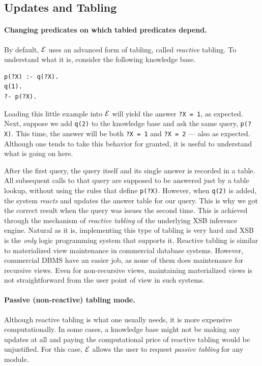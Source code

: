 \documentclass[11pt]{article}
\newcommand{\ERGO}{\mbox{\ensuremath{\cal{E}}\smaller{{\sc{RGO}}}}\xspace}
\newcommand{\FLSYSTEM}{\ERGO}
\begin{document}
\subsection{Updates and Tabling}\label{sec-updates-tabling}

\paragraph{Changing predicates on which tabled predicates depend.}
By default, \FLSYSTEM uses an advanced form of tabling, called
\emph{reactive} tabling. To understand what it is, consider the following
knowledge base.
\begin{verbatim}
p(?X) :- q(?X).
q(1).
?- p(?X).
\end{verbatim}
Loading this little example into \FLSYSTEM will yield the answer
\texttt{?X = 1}, as expected. Next, suppose we add \texttt{q(2)} to the
knowledge base and ask the same query, \texttt{p(?X)}. This time, the answer
will be both \texttt{?X = 1} and \texttt{?X = 2} --- also as expected.
Although one tends to take this behavior for granted, it is useful to
understand what is going on here.

After the first query, the query itself and its single answer is recorded
in a table. All subsequent calls to that query are supposed to be answered
just by a table lookup, without using the rules that define \texttt{p(?X)}.
However, when \texttt{q(2)} is added, the system \emph{reacts} and updates the
answer table for our query. This is why we got the correct result when the
query was issues the second time. This is achieved through the mechanism of
\emph{reactive tabling} of the underlying XSB inference engine. Natural as
it is, implementing this type of tabling is very hard and XSB is the
\emph{only} logic programming system that supports it.
Reactive tabling is similar to materialized view maintenance in commercial
database systems. However, commercial DBMS have an easier job, as none of
them does maintenance for recursive views. Even for non-recursive views,
maintaining materialized views is not straightforward from the user
point of view in such systems.

\paragraph{Passive (non-reactive) tabling mode.}
Although reactive tabling is what one usually needs, it is more expensive
computationally. In some cases, a knowledge base might not be making any
updates at all and paying the computational
price of reactive tabling would be unjustified.
For this case, \FLSYSTEM allows the user to request \emph{passive tabling}
for any module.  
\end{document}
